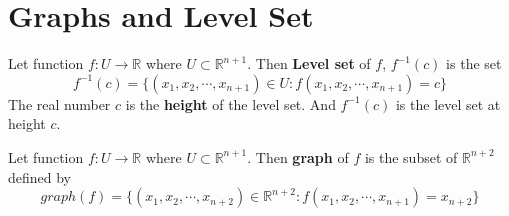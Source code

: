 

\section{Graphs and Level Set}
\begin{definition}
	Let function $f : U \to \mathbb{R}$ where $U \subset \mathbb{R}^{n+1}$.
	Then \textbf{Level set} of $f$, $f^{-1}(c)$ is the set
	\begin{equation}
		f^{-1}(c) = \{ (x_1,x_2,\cdots,x_{n+1}) \in U : f(x_1,x_2,\cdots,x_{n+1}) = c \}
	\end{equation} 
	The real number $c$ is the \textbf{height} of the level set.
	And $f^{-1}(c)$ is the level set at height $c$.
\end{definition}

\begin{definition}
	Let function $f : U \to \mathbb{R}$ where $U \subset \mathbb{R}^{n+1}$.
	Then \textbf{graph} of $f$ is the subset of $\mathbb{R}^{n+2}$ defined by
\begin{equation}
	graph(f) = \{ (x_1,x_2,\cdots,x_{n+2}) \in \mathbb{R}^{n+2} : f(x_1,x_2,\cdots,x_{n+1}) = x_{n+2} \}
\end{equation}
\end{definition}

